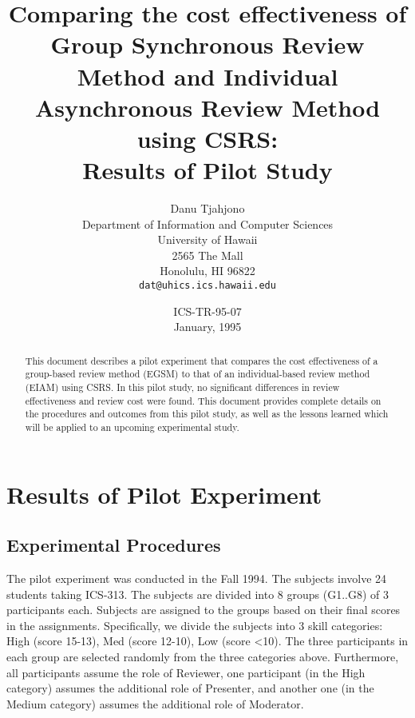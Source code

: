 



 

\title{Comparing the cost effectiveness of Group Synchronous Review
Method and Individual Asynchronous Review Method using CSRS: \\
Results of Pilot Study} 

\author {Danu Tjahjono \\
         Department of Information and Computer Sciences \\
         University of Hawaii \\
         2565 The Mall\\
         Honolulu, HI 96822\\
         {\tt dat@uhics.ics.hawaii.edu}}

\date {ICS-TR-95-07\\ January, 1995}

\maketitle

\begin{abstract}
  This document describes a pilot experiment that compares the cost
  effectiveness of a group-based review method (EGSM) to that of an
  individual-based review method (EIAM) using CSRS. In this pilot study, no
  significant differences in review effectiveness and review cost were
  found. This document provides complete details on the procedures and
  outcomes from this pilot study, as well as the lessons learned which will
  be applied to an upcoming experimental study.
\end{abstract}

\chapter{Results of Pilot Experiment}

\section{Experimental Procedures}
The pilot experiment was conducted in the Fall 1994.
The subjects involve 24 students taking ICS-313. The subjects are
divided into 8 groups (G1..G8) of 3 participants each. 
Subjects are assigned to the groups based on their final scores in the
assignments. Specifically, we divide the subjects into 3 skill categories:
High (score 15-13), Med (score 12-10), Low (score <10). The three
participants in each group are selected randomly from the three
categories above. Furthermore, all participants assume the role of
Reviewer, one participant (in the High category) assumes the
additional role of Presenter, and another one (in the Medium category)
assumes the additional role of Moderator.

